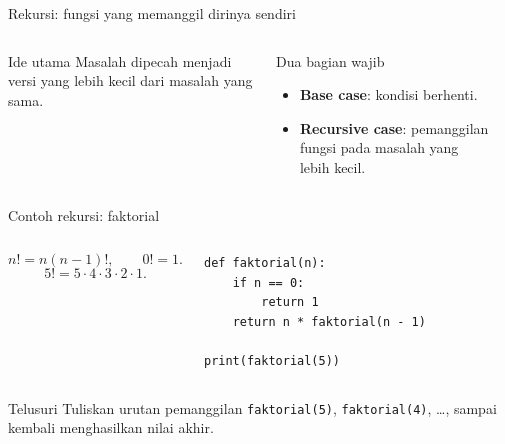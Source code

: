 \documentclass[aspectratio=169,11pt]{beamer}
\begin{document}
\begin{frame}{Rekursi: fungsi yang memanggil dirinya sendiri}
\begin{columns}[T]
\begin{block}{Ide utama}
Masalah dipecah menjadi versi yang lebih kecil dari masalah yang sama.
\end{block}
\begin{block}{Dua bagian wajib}
\begin{itemize}
  \item \textbf{Base case}: kondisi berhenti.
  \item \textbf{Recursive case}: pemanggilan fungsi pada masalah yang lebih kecil.
\end{itemize}
\end{block}
\begin{center}
\end{center}
\end{columns}
\end{frame}

\begin{frame}[fragile]{Contoh rekursi: faktorial}
\begin{columns}[T]
\[
n! = n(n-1)!, \qquad 0! = 1.
\]
\[
5! = 5\cdot 4\cdot 3\cdot 2\cdot 1.
\]
\begin{lstlisting}
def faktorial(n):
    if n == 0:
        return 1
    return n * faktorial(n - 1)

print(faktorial(5))
\end{lstlisting}
\end{columns}
\begin{block}{Telusuri}
Tuliskan urutan pemanggilan \texttt{faktorial(5)}, \texttt{faktorial(4)}, \ldots, sampai kembali menghasilkan nilai akhir.
\end{block}
\end{frame}
\end{document}
